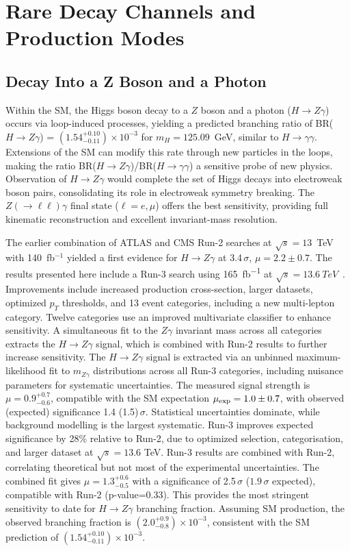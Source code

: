 \documentclass[a4paper,11pt]{article}
\begin{document}
\section{Rare Decay Channels and Production Modes}

\subsection{Decay Into a Z Boson and a Photon}

Within the SM, the Higgs boson decay to a $Z$ boson and a photon ($H
\to Z\gamma$) occurs via loop-induced processes, yielding a predicted
branching ratio of BR($H \to Z\gamma$) = $(1.54^{+0.10}_{-0.11})
\times 10^{-3}$ for $m_H = 125.09$~GeV, similar to $H \to
\gamma\gamma$. Extensions of the SM can modify this rate through new
particles in the loops, making the ratio BR($H \to Z\gamma$)/BR($H \to
\gamma\gamma$) a sensitive probe of new physics. Observation of $H \to
Z\gamma$ would complete the set of Higgs decays into electroweak boson
pairs, consolidating its role in electroweak symmetry breaking. The
$Z(\to \ell\ell)\gamma$ final state ($\ell=e,\mu$) offers the best
sensitivity, providing full kinematic reconstruction and excellent
invariant-mass resolution.

The earlier combination of ATLAS and CMS Run-2 searches at
$\sqrt{s}=13$~TeV with 140~fb$^{-1}$ yielded a first evidence for $H
\to Z\gamma$ at 3.4\,$\sigma$, $\mu = 2.2 \pm 0.7$. The results
presented here include a Run-3 search using \SI{165}{fb^{-1}} at
$\sqrt{s}=\SI{13.6}{TeV}$~\cite{hzgamma-atlas}. Improvements include
increased production cross-section, larger datasets, optimized $p_T$
thresholds, and 13 event categories, including a new multi-lepton
category. Twelve categories use an improved multivariate classifier to
enhance sensitivity. A simultaneous fit to the $Z\gamma$ invariant
mass across all categories extracts the $H \to Z\gamma$ signal, which
is combined with Run-2 results to further increase sensitivity.
%
The $H\to Z\gamma$ signal is extracted via an unbinned
maximum-likelihood fit to $m_{Z\gamma}$ distributions across all Run-3
categories, including nuisance parameters for systematic
uncertainties.  The measured signal strength is $\mu =
0.9^{+0.7}_{-0.6}$, compatible with the SM expectation $\mu_{\rm exp}
= 1.0\pm0.7$, with observed (expected) significance 1.4
(1.5)\,$\sigma$.  Statistical uncertainties dominate, while background
modelling is the largest systematic.  Run-3 improves expected
significance by 28\% relative to Run-2, due to optimized selection,
categorisation, and larger dataset at $\sqrt{s}=13.6$ TeV.  Run-3
results are combined with Run-2, correlating theoretical but not most
of the experimental uncertainties.  The combined fit gives $\mu =
1.3^{+0.6}_{-0.5}$ with a significance of 2.5\,$\sigma$ ($1.9\,\sigma$
expected), compatible with Run-2 (p-value=0.33).  This provides the
most stringent sensitivity to date for $H\to Z\gamma$ branching
fraction.  Assuming SM production, the observed branching fraction is
$(2.0^{+0.9}_{-0.8})\times 10^{-3}$, consistent with the SM prediction
of $(1.54^{+0.10}_{-0.11})\times 10^{-3}$.
\end{document}
